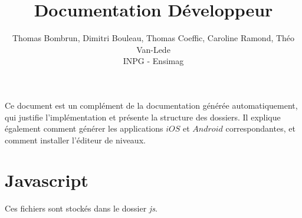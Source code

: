\documentclass[11pt]{article}
\begin{document}
\title{Documentation Développeur}
\author{Thomas Bombrun, Dimitri Bouleau, Thomas Coeffic, Caroline Ramond, Théo Van-Lede\\
INPG - Ensimag}
\renewcommand{\today}{17 Juin 2014}
\maketitle
Ce document est un complément de la documentation générée automatiquement, 
qui justifie l'implémentation et présente la structure des dossiers. Il explique également comment générer les applications $iOS$ et $Android$ correspondantes, et comment installer l'éditeur de niveaux.

\section {Javascript}
Ces fichiers sont stockés dans le dossier {\em js}.
\end{document}
